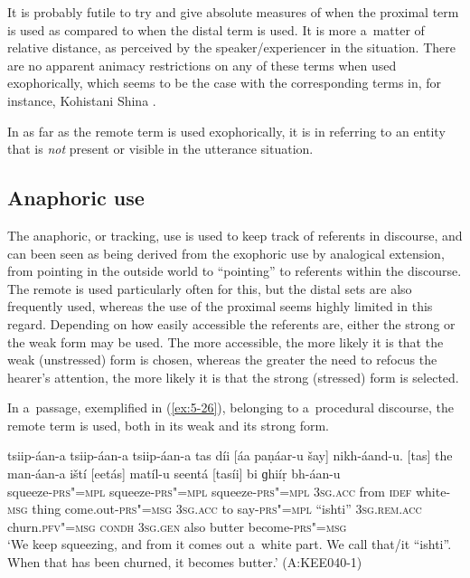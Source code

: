 It is probably futile to try and give absolute measures of when the proximal term is used as compared to when the distal term is used. It is more a~matter of relative distance, as perceived by the speaker/experiencer in the situation. There are no apparent animacy restrictions on any of these terms when used exophorically, which seems to be the case with the corresponding terms in, for instance, Kohistani Shina \citep[135]{schmidtkohistani2001}.

In as far as the remote term is used exophorically, it is in referring to an entity that is \textit{not} present or visible in the utterance situation. 


\subsection{Anaphoric use}
\label{subsec:5-2-4}

The anaphoric, or tracking, use is used to keep track of referents in discourse, and can been seen as being derived from the exophoric use by analogical extension, from pointing in the outside world to ``pointing'' to referents within the discourse. The remote is used particularly often for this, but the distal sets are also frequently used, whereas the use of the proximal seems highly limited in this regard. Depending on how easily accessible the referents are, either the strong or the weak form may be used. The more accessible, the more likely it is that the weak (unstressed) form is chosen, whereas the greater the need to refocus the hearer's attention, the more likely it is that the strong (stressed) form is selected. 


In a~passage, exemplified in (\ref{ex:5-26}), belonging to a~procedural discourse, the remote term is used, both in its weak and its strong form.


\begin{exe}
\ex
\label{ex:5-26}
\gll tsiip-áan-a tsiip-áan-a tsiip-áan-a tas díi [áa paṇáar-u
 šay] nikh-áand-u. [tas] the man-áan-a iští [eetás] matíl-u
seentá [tasíi] bi ɡhiíṛ bh-áan-u \\
squeeze-\textsc{prs"=mpl} squeeze-\textsc{prs"=mpl} squeeze-\textsc{prs"=mpl} \textsc{3sg.acc} from
\textsc{idef} white-\textsc{msg} thing come.out-\textsc{prs"=msg} \textsc{3sg.acc}
to say-\textsc{prs"=mpl} ``ishti'' \textsc{3sg.rem.acc} churn.\textsc{pfv"=msg}
\textsc{condh} \textsc{3sg.gen} also butter become-\textsc{prs"=msg}\\
\glt `We keep squeezing, and from it comes out a~white part. We call that/it ``ishti''. When that has been
churned, it becomes butter.' (A:KEE040-1)
\end{exe}

